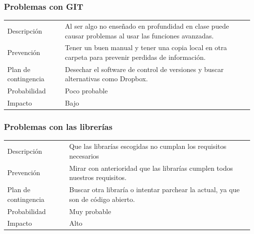 \subsubsection{Problemas con GIT}
\begin{table}[H]
    \begin{center}
        \begin{tabular}{l p{8cm}}
            Descripci\'{o}n                 & Al ser algo no ense\~{n}ado en profundidad en clase puede causar problemas al usar las
            funciones avanzadas. \\
            Prevenci\'{o}n                  & Tener un buen manual y tener una copia local en otra carpeta para prevenir perdidas de informaci\'{o}n. \\ 
            Plan de contingencia            & Desechar el software de control de versiones y buscar alternativas como Dropbox. \\
            Probabilidad                    & Poco probable \\
            Impacto                         & Bajo \\
        \end{tabular}
    \end{center}  
\end{table}
\subsubsection{Problemas con las librer\'{i}as}
\begin{table}[H]
    \begin{center}
        \begin{tabular}{l p{8cm}}
            Descripci\'{o}n                 & Que las librar\'{i}as escogidas no cumplan los requisitos necesarios \\
            Prevenci\'{o}n                  & Mirar con anterioridad que las librar\'{i}as cumplen todos nuestros requisitos. \\ 
            Plan de contingencia            & Buscar otra librar\'{i}a o intentar parchear la actual, ya que son de c\'{o}digo abierto. \\
            Probabilidad                    & Muy probable \\
            Impacto                         & Alto \\
        \end{tabular}
    \end{center}
    
\end{table}
